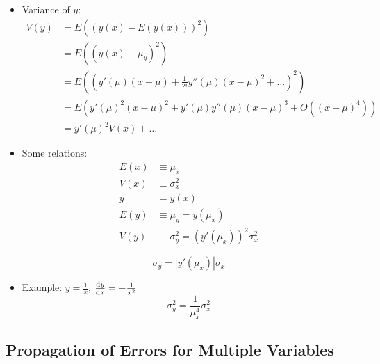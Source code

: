 \begin{itemize}
      \item Variance of $y$:
            \begin{align}
                  V(y) & = E((y(x)-E(y(x)))^2)                                               \\
                       & = E((y(x) - \mu_y)^2)                                               \\
                       & = E((y'(\mu)(x-\mu) + \frac{1}{2!} y''(\mu)(x-\mu)^2 + \ldots)^2)   \\
                       & = E(y'(\mu)^2 (x-\mu)^2 + y'(\mu) y''(\mu)(x-\mu)^3 + O((x-\mu)^4)) \\
                       & = y'(\mu)^2 V(x) + \ldots
            \end{align}

      \item Some relations:
            \begin{align*}
                  E(x) & \equiv \mu_x                                 \\
                  V(x) & \equiv \sigma_x^2                            \\
                  y    & = y(x)                                       \\
                  E(y) & \equiv \mu_y = y(\mu_x)                      \\
                  V(y) & \equiv \sigma_y^2 = (y'(\mu_x))^2 \sigma_x^2
            \end{align*}

            \[ \sigma_y = |y'(\mu_x)| \sigma_x \]

      \item Example: $ y = \frac{1}{x}$, $\dv{y}{x} = -\frac{1}{x^2}$
            \[ \sigma^2_y = \frac{1}{\mu_x^4} \sigma_x^2 \]
\end{itemize}

\subsection{Propagation of Errors for Multiple Variables}

